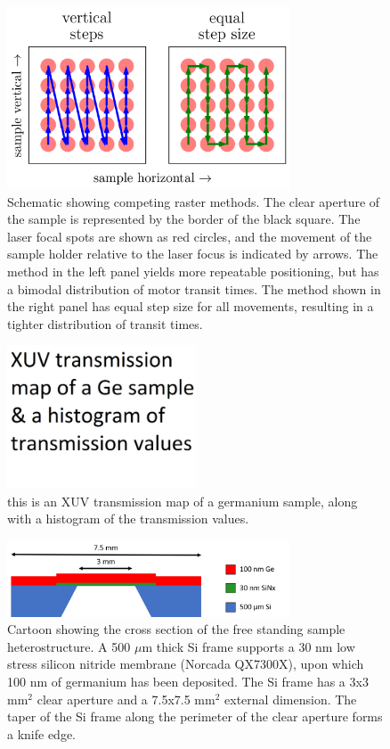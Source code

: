 \begin{figure}
	\centering
	\includegraphics[width=0.75\textwidth]{figures/chap3/Rastering_Methods.png}
	\caption{Schematic showing competing raster methods. The clear aperture of the sample is represented by the border of the black square. The laser focal spots are shown as red circles, and the movement of the sample holder relative to the laser focus is indicated by arrows. The method in the left panel yields more repeatable positioning, but has a bimodal distribution of motor transit times. The method shown in the right panel has equal step size for all movements, resulting in a tighter distribution of transit times.}
	\label{fig:Rastering_Methods}
\end{figure}

\begin{figure}
	\centering
	\includegraphics[width=0.5\textwidth]{figures/chap3/Ge_sample_map.png}
	\caption{this is an XUV transmission map of a germanium sample, along with a histogram of the transmission values.}
	\label{fig:Ge_sample_map}
\end{figure}

\begin{figure}
	\centering
	\includegraphics[width=0.75\textwidth]{figures/chap3/Sample_Geometry.png}
	\caption{Cartoon showing the cross section of the free standing sample heterostructure. A 500 $\mu$m thick Si frame supports a 30 nm low stress silicon nitride membrane (Norcada QX7300X), upon which 100 nm of germanium has been deposited. The Si frame has a 3x3 mm$^2$ clear aperture and a 7.5x7.5 mm$^2$ external dimension. The taper of the Si frame along the perimeter of the clear aperture forms a knife edge.}
	\label{fig:Sample_Geometry}
\end{figure}

